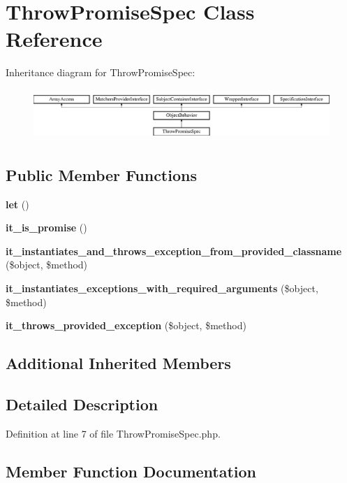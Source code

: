\section{Throw\+Promise\+Spec Class Reference}
\label{classspec_1_1_prophecy_1_1_promise_1_1_throw_promise_spec}
Inheritance diagram for Throw\+Promise\+Spec\+:\begin{figure}[H]
\begin{center}
\leavevmode
\includegraphics[height=1.953488cm]{classspec_1_1_prophecy_1_1_promise_1_1_throw_promise_spec}
\end{center}
\end{figure}
\subsection*{Public Member Functions}
\begin{DoxyCompactItemize}
\item 
{\bf let} ()
\item 
{\bf it\+\_\+is\+\_\+promise} ()
\item 
{\bf it\+\_\+instantiates\+\_\+and\+\_\+throws\+\_\+exception\+\_\+from\+\_\+provided\+\_\+classname} (\$object, \$method)
\item 
{\bf it\+\_\+instantiates\+\_\+exceptions\+\_\+with\+\_\+required\+\_\+arguments} (\$object, \$method)
\item 
{\bf it\+\_\+throws\+\_\+provided\+\_\+exception} (\$object, \$method)
\end{DoxyCompactItemize}
\subsection*{Additional Inherited Members}


\subsection{Detailed Description}


Definition at line 7 of file Throw\+Promise\+Spec.\+php.



\subsection{Member Function Documentation}
